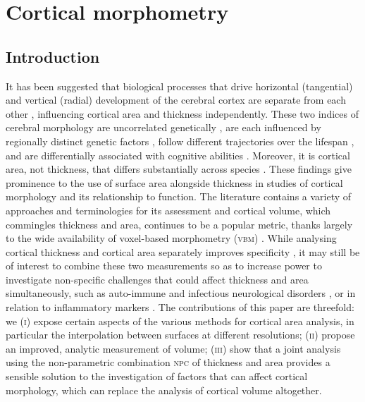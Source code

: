 \chapter{Cortical morphometry}
\setstretch{\lspac}

\section{Introduction}
\label{sec:cortex:intro}
\setstretch{\lspac}

It has been suggested that biological processes that drive horizontal (tangential) and vertical (radial) development of the cerebral cortex are separate from each other \citep{Rakic1988,Geschwind2013}, influencing cortical area and thickness independently. These two indices of cerebral morphology are uncorrelated genetically \citep{Panizzon2009, Winkler2010}, are each influenced by regionally distinct genetic factors \citep{Schmitt2008, Rimol2010_bp, Chen2012}, follow different trajectories over the lifespan \citep{OLeary2007, Hogstrom2013, Fjell2015}, and are differentially associated with cognitive abilities \citep{Schnack2015, Noble2015, Vuoksimaa2016}. Moreover, it is cortical area, not thickness, that differs substantially across species \citep{Rakic1995}. These findings give prominence to the use of surface area alongside thickness in studies of cortical morphology and its relationship to function. The literature contains a variety of approaches and terminologies for its assessment and cortical volume, which commingles thickness and area, continues to be a popular metric, thanks largely to the wide availability of voxel-based morphometry (\textsc{vbm}) \citep{Ashburner2000, Good2001, Douaud2007}. While analysing cortical thickness and cortical area separately improves specificity \citep{Rimol2012}, it may still be of interest to combine these two measurements so as to increase power to investigate non-specific challenges that could affect thickness and area simultaneously, such as auto-immune \citep{Ceccarelli2008, Zhang2016} and infectious neurological disorders \citep{Gitelman2001, Kuper2011}, or in relation to inflammatory markers \citep{Marsland2008, Zhang2015}. The contributions of this paper are threefold: we (\textsc{i}) expose certain aspects of the various methods for cortical area analysis, in particular the interpolation between surfaces at different resolutions; (\textsc{ii}) propose an improved, analytic measurement of volume; (\textsc{iii}) show that a joint analysis using the non-parametric combination \textsc{npc} \citep{Pesarin2010, Winkler2016_npc} of thickness and area provides a sensible solution to the investigation of factors that can affect cortical morphology, which can replace the analysis of cortical volume altogether.
 
